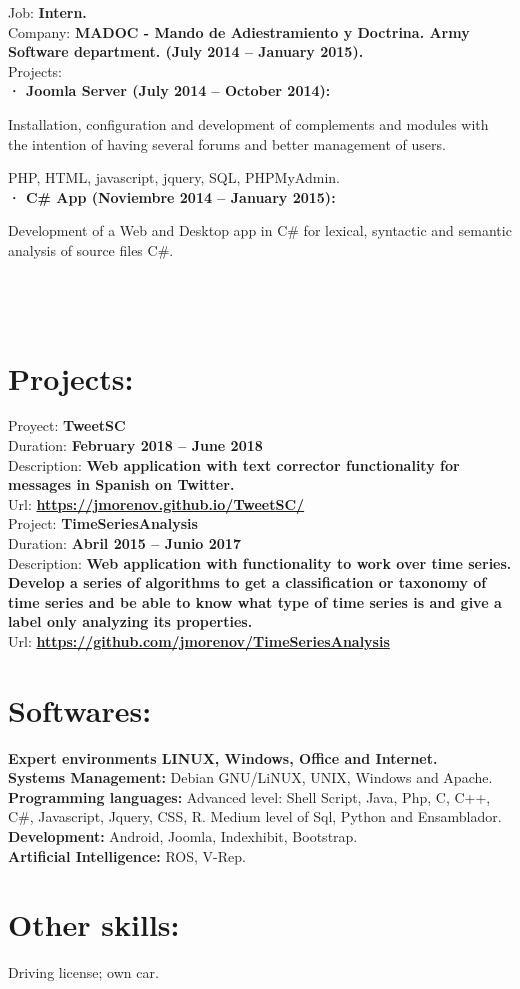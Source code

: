 \documentclass	[10pt,a4paper,oneside]{article}
\newcommand{\seccion}[1]{\vspace*{3mm}\section*{#1}\vspace*{-3mm}}
\begin{document}
\newpage
Job: \textbf{Intern.}\\
Company: \textbf{MADOC - Mando de Adiestramiento y Doctrina. Army Software department. (July 2014 – January 2015).}\\
Projects:\\
\hspace*{1cm}\textbf{· Joomla Server (July 2014 – October 2014):}\par
{\addtolength{\leftskip}{2cm}Installation, configuration and development of complements and modules with the intention of having several forums and better management of users.\par}
\hspace*{2cm}PHP, HTML, javascript, jquery, SQL, PHPMyAdmin.\\
\hspace*{1cm}\textbf{· C\# App (Noviembre 2014 – January 2015):}\par
{\addtolength{\leftskip}{2cm}
Development of a Web and Desktop app in C\# for lexical, syntactic and semantic analysis of source files C\#.\\\\\\\\\par}

\seccion{Projects:}

Proyect: \textbf{TweetSC}\\
Duration: \textbf{February 2018 – June 2018}\\
Description: \textbf{Web application with text corrector functionality for messages in Spanish on Twitter.}\\
Url: \textbf{\url{https://jmorenov.github.io/TweetSC/}}\\

Project: \textbf{TimeSeriesAnalysis}\\
Duration: \textbf{Abril 2015 – Junio 2017}\\
Description: \textbf{Web application with functionality to work over time series. Develop a series of algorithms to get a classification or taxonomy of time series and be able to know what type of time series is and give a label only analyzing its properties.}\\
Url: \textbf{\url{https://github.com/jmorenov/TimeSeriesAnalysis}}


\seccion{Softwares:}
\textbf{Expert environments LINUX, Windows, Office and Internet.}\\
\textbf{Systems Management:} Debian GNU/LiNUX, UNIX, Windows and Apache.\\
\textbf{Programming languages:} Advanced level: Shell Script, Java, Php, C,
C++, C\#, Javascript, Jquery, CSS, R. Medium level of Sql, Python and Ensamblador.\\
\textbf{Development:} Android, Joomla, Indexhibit, Bootstrap.\\
\textbf{Artificial Intelligence:} ROS, V-Rep.


\seccion{Other skills:}
Driving license; own car.\\
\end{document}
